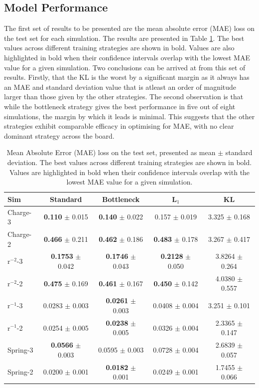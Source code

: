\documentclass[11pt]{article}
\begin{document}
\subsection{Model Performance}
The first set of results to be presented are the mean absolute error (MAE) loss on the test set for each simulation. The results are presented in Table \ref{tab:mae_table_with_std}. The best values across different training strategies are shown in bold. Values are also highlighted in bold when their confidence intervals overlap with the lowest MAE value for a given simulation. Two conclusions can be arrived at from this set of results. Firstly, that the KL is the worst by a significant margin as it always has an MAE and standard deviation value that is atleast an order of magnitude larger than those given by the other strategies. The second observation is that while the bottleneck strategy gives the best performance in five out of eight simulations, the margin by which it leads is minimal. This suggests that the other strategies exhibit comparable efficacy in optimising for MAE, with no clear dominant strategy across the board.
\begin{table}[H]
    \centering
    \begin{tabular}{lcccc}
    \hline
    Sim & Standard & Bottleneck & L$_1$ & KL \\
    \hline
    Charge-3 & \textbf{0.110} $\pm$ 0.015 & \textbf{0.140} $\pm$ 0.022 & 0.157 $\pm$ 0.019 & 3.325 $\pm$ 0.168 \\
    Charge-2 & \textbf{0.466} $\pm$ 0.211 & \textbf{0.462} $\pm$ 0.186 & \textbf{0.483} $\pm$ 0.178 & 3.267 $\pm$ 0.417 \\
    r$^{-2}$-3 & \textbf{0.1753} $\pm$ 0.042 & \textbf{0.1746} $\pm$ 0.043 & \textbf{0.2128} $\pm$ 0.050 & 3.8264 $\pm$ 0.264 \\
    r$^{-2}$-2 & \textbf{0.475} $\pm$ 0.169 & \textbf{0.461} $\pm$ 0.167 & \textbf{0.450} $\pm$ 0.142 & 4.0380 $\pm$ 0.557 \\
    r$^{-1}$-3 & 0.0283 $\pm$ 0.003 & \textbf{0.0261} $\pm$ 0.003 & 0.0408 $\pm$ 0.004 & 3.251 $\pm$ 0.101 \\
    r$^{-1}$-2 & 0.0254 $\pm$ 0.005 & \textbf{0.0238} $\pm$ 0.005 & 0.0326 $\pm$ 0.004 & 2.3365 $\pm$ 0.147 \\
    Spring-3 & \textbf{0.0566} $\pm$ 0.003 & 0.0595 $\pm$ 0.003 & 0.0728 $\pm$ 0.004 & 2.6839 $\pm$ 0.057 \\
    Spring-2 & 0.0200 $\pm$ 0.001 & \textbf{0.0182} $\pm$ 0.001 & 0.0249 $\pm$ 0.001 & 1.7455 $\pm$ 0.066 \\
    \hline
    \end{tabular}
    \caption{Mean Absolute Error (MAE) loss on the test set, presented as mean $\pm$ standard deviation. The best values across different training strategies are shown in bold. Values are highlighted in bold when their confidence intervals overlap with the lowest MAE value for a given simulation.}
    \label{tab:mae_table_with_std}
    \end{table}
\end{document}
